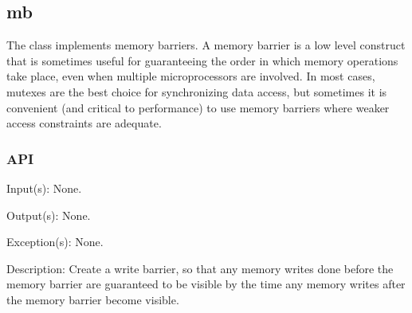 %
%
%
%
%

\subsection{mb}
\label{mb}

The  class implements memory barriers.  A memory barrier is a low
level construct that is sometimes useful for guaranteeing the order in which
memory operations take place, even when multiple microprocessors are involved.
In most cases, mutexes are the best choice for synchronizing data access, but
sometimes it is convenient (and critical to performance) to use memory barriers
where weaker access constraints are adequate.

\subsubsection{API}
\begin{capi}
\label{mb_write}
	\begin{capilist}
	\item[Input(s): ] None.
	\item[Output(s): ] None.
	\item[Exception(s): ] None.
	\item[Description: ]
		Create a write barrier, so that any memory writes done before
		the memory barrier are guaranteed to be visible by the time any
		memory writes after the memory barrier become visible.
	\end{capilist}
\end{capi}

